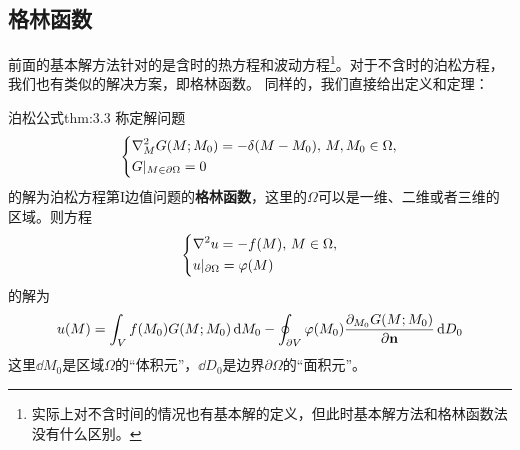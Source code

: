 \subsection{格林函数}
前面的基本解方法针对的是含时的热方程和波动方程\footnote{实际上对不含时间的情况也有基本解的定义，但此时基本解方法和格林函数法没有什么区别。}。对于不含时的泊松方程，我们也有类似的解决方案，即格林函数。
同样的，我们直接给出定义和定理：
\begin{theorem}{泊松公式}{thm:3.3}
    称定解问题
    \begin{equation*}
        \left\{
            \begin{aligned}
                &\laplacian_{M}{G(M;M_0)} = -\delta(M - M_0),\, M, M_0 \in \Omega,\\
                &G|_{M \in \partial \Omega} = 0
            \end{aligned}
        \right.
    \end{equation*}
    的解为泊松方程第I边值问题的\textbf{格林函数}，这里的$\Omega$可以是一维、二维或者三维的区域。则方程
    \begin{equation*}
        \left\{
            \begin{aligned}
                &\laplacian{u} = -f(M),\, M \in \Omega,\\
                &u|_{\partial \Omega} = \varphi(M)
            \end{aligned}
        \right.
    \end{equation*}
    的解为
    \[u(M) = \int_{V} f(M_0)G(M;M_0) \dd{M_0} - \oint_{\partial V} \varphi(M_0) \pdv{_{M_0}G(M;M_0)}{\vb{n}} \dd{D_0}\]
    这里$\dd{M_0}$是区域$\Omega$的“体积元”，$\dd{D_0}$是边界$\partial \Omega$的“面积元”。
\end{theorem}